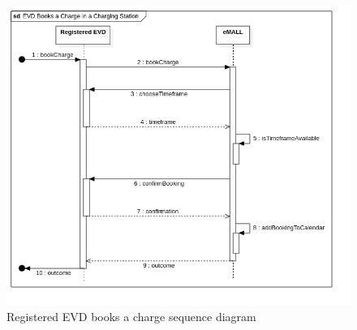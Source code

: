 \begin{center}
    \begin{figure} [H]
        \begin{center}
            \includegraphics[width=0.9\linewidth]{Images/SequenceDiagrams/evd_books_a_charge_in_a_charging_station}
            \caption{Registered EVD books a charge sequence diagram}
            \label{fig: evd_books_charge_seq_diag}
        \end{center}
    \end{figure}
\end{center}


